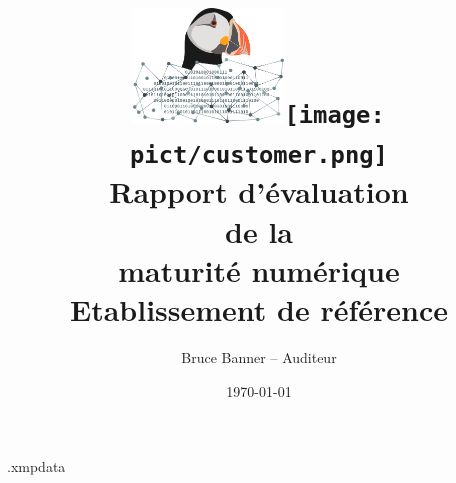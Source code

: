 \begin{filecontents*}{\jobname.xmpdata}
\end{filecontents*}

\documentclass[a4paper,11pt]{article}



\title{\includegraphics[width=0.30\textwidth]{pict/archoad.png}\hfill\texttt{[image: pict/customer.png]}\\\bigskip\bigskip
 Rapport d'évaluation\\de la\\maturité numérique\\ \textcolor{myBlue}{Etablissement de référence}}

\author{Bruce Banner -- \textcolor{myBlue}{Auditeur}}

\date{\today}



\maketitle

\bigskip\bigskip


\bigskip\bigskip

\begin{itemize}
\item Directeur de l'établissement: \textsl{Benjamin GRIMM}
\item RSSI de l'établissement: \textsl{Donald BLAKE}
\end{itemize}

\bigskip\bigskip

\begin{center}
\Large{\textcolor{myRed}{Rapport validé}}
\end{center}

